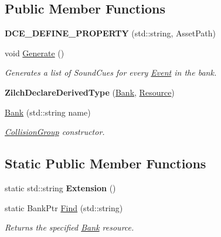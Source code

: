 \subsection*{Public Member Functions}
\begin{DoxyCompactItemize}
\item 
\hypertarget{classDCEngine_1_1Bank_afd76b244ded7d26fe0d197536d9193bb}{{\bfseries D\-C\-E\-\_\-\-D\-E\-F\-I\-N\-E\-\_\-\-P\-R\-O\-P\-E\-R\-T\-Y} (std\-::string, Asset\-Path)}\label{classDCEngine_1_1Bank_afd76b244ded7d26fe0d197536d9193bb}

\item 
\hypertarget{classDCEngine_1_1Bank_a0fd92945984cae8248c2fa85106fcf15}{void \hyperlink{classDCEngine_1_1Bank_a0fd92945984cae8248c2fa85106fcf15}{Generate} ()}\label{classDCEngine_1_1Bank_a0fd92945984cae8248c2fa85106fcf15}

\begin{DoxyCompactList}\small\item\em Generates a list of Sound\-Cues for every \hyperlink{classDCEngine_1_1Event}{Event} in the bank. \end{DoxyCompactList}\item 
\hypertarget{classDCEngine_1_1Bank_aaf783acc5b1ef653f29e54ec52bd3610}{{\bfseries Zilch\-Declare\-Derived\-Type} (\hyperlink{classDCEngine_1_1Bank}{Bank}, \hyperlink{classDCEngine_1_1Resource}{Resource})}\label{classDCEngine_1_1Bank_aaf783acc5b1ef653f29e54ec52bd3610}

\item 
\hypertarget{classDCEngine_1_1Bank_ae83da3f3d70606509782927cf08e227b}{\hyperlink{classDCEngine_1_1Bank_ae83da3f3d70606509782927cf08e227b}{Bank} (std\-::string name)}\label{classDCEngine_1_1Bank_ae83da3f3d70606509782927cf08e227b}

\begin{DoxyCompactList}\small\item\em \hyperlink{classDCEngine_1_1CollisionGroup}{Collision\-Group} constructor. \end{DoxyCompactList}\end{DoxyCompactItemize}
\subsection*{Static Public Member Functions}
\begin{DoxyCompactItemize}
\item 
\hypertarget{classDCEngine_1_1Bank_af4b3d41bd8c66cc9454de552f3b340fc}{static std\-::string {\bfseries Extension} ()}\label{classDCEngine_1_1Bank_af4b3d41bd8c66cc9454de552f3b340fc}

\item 
static Bank\-Ptr \hyperlink{classDCEngine_1_1Bank_a1f4bb03abde770a8a9966ce669c24fdf}{Find} (std\-::string)
\begin{DoxyCompactList}\small\item\em Returns the specified \hyperlink{classDCEngine_1_1Bank}{Bank} resource. \end{DoxyCompactList}\end{DoxyCompactItemize}

